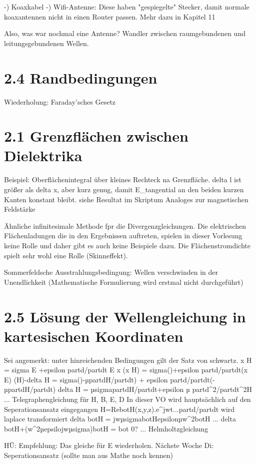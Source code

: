 \documentclass[a4paper]{article}
\begin{document}
-) Koaxkabel
-) Wifi-Antenne: Diese haben "gespiegelte" Stecker, damit normale koaxantennen 
    nicht in einen Router passen. Mehr dazu in Kapitel 11

Also, was war nochmal eine Antenne? Wandler zwischen raumgebundenen und
                                    leitungsgebundenen Wellen.

\section{2.4 Randbedingungen}
Wiederholung: Faraday'sches Gesetz

\section{2.1 Grenzflächen zwischen Dielektrika}
Beispiel: Oberflächenintegral über kleines Rechteck na Grenzfläche.
        delta l ist größer als delta x, aber kurz genug, damit E_tangential an
        den beiden kurzen Kanten konstant bleibt.
    siehe Resultat im Skriptum
Analoges zur magnetischen Feldstärke

Ähnliche infinitesimale Methode fpr die Divergenzgleichungen.
Die elektrischen Flächenladungen die in den Ergebnissen auftreten, spielen in
dieser Vorlesung keine Rolle und daher gibt es auch keine Beispiele dazu.
Die Flächenstromdichte spielt sehr wohl eine Rolle (Skinneffekt).

Sommerfeldsche Ausstrahlungsbedingung: Wellen verschwinden in der Unendlichkeit
        (Mathematische Formulierung wird erstmal nicht durchgeführt)

\section{2.5 Lösung der Wellengleichung in kartesischen Koordinaten}
Sei angemerkt: unter hinreichenden Bedingungen  gilt der Satz von schwartz.
\nabla x H = sigma E +epsilon partd/partdt E
\nabla x (\nabla x H) = sigma(\nablaxE)+epsilon partd/partdt(\nabla x E)
\nabla(\nabla H)-delta H = sigma()-µpartdH/partdt) + epsilon partd/partdt(-µpartdH/partdt)
delta H = µsigmapartdH/partdt+epsilon µ partd^2/partdt^2H          ... Telegraphengleichung für H, B, E, D
In dieser VO wird hauptsächlich auf den Seperationsansatz eingegangen
H=Re{botH(x,y,z).e^jwt}...partd/partdt wird laplace transformiert
delta botH = jwµsigmabotHepsilonµw^2botH ... delta botH+(w^2µepsilojwµsigma)botH = bot 0? ... Helmholtzgleichung

HÜ: Empfehlung: Das gleiche für E wiederholen.
Nächste Woche Di: Seperationsansatz (sollte man aus Mathe noch kennen)
\end{document}
